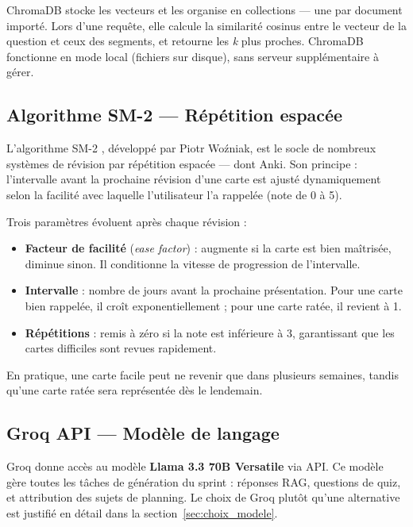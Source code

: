 ChromaDB \cite{chromadb} stocke les vecteurs et les organise en collections — une par document importé. Lors d'une requête, elle calcule la similarité cosinus entre le vecteur de la question et ceux des segments, et retourne les \textit{k} plus proches. ChromaDB fonctionne en mode local (fichiers sur disque), sans serveur supplémentaire à gérer.

\subsection{Algorithme SM-2 — Répétition espacée}

L'algorithme SM-2 \cite{sm2}, développé par Piotr Woźniak, est le socle de nombreux systèmes de révision par répétition espacée — dont Anki. Son principe : l'intervalle avant la prochaine révision d'une carte est ajusté dynamiquement selon la facilité avec laquelle l'utilisateur l'a rappelée (note de 0 à 5).

Trois paramètres évoluent après chaque révision :
\begin{itemize}
    \item \textbf{Facteur de facilité} (\textit{ease factor}) : augmente si la carte est bien maîtrisée, diminue sinon. Il conditionne la vitesse de progression de l'intervalle.
    \item \textbf{Intervalle} : nombre de jours avant la prochaine présentation. Pour une carte bien rappelée, il croît exponentiellement ; pour une carte ratée, il revient à 1.
    \item \textbf{Répétitions} : remis à zéro si la note est inférieure à 3, garantissant que les cartes difficiles sont revues rapidement.
\end{itemize}

En pratique, une carte facile peut ne revenir que dans plusieurs semaines, tandis qu'une carte ratée sera représentée dès le lendemain.

\subsection{Groq API — Modèle de langage}

Groq \cite{groq} donne accès au modèle \textbf{Llama 3.3 70B Versatile} \cite{llama3} via API. Ce modèle gère toutes les tâches de génération du sprint : réponses RAG, questions de quiz, et attribution des sujets de planning. Le choix de Groq plutôt qu'une alternative est justifié en détail dans la section~\ref{sec:choix_modele}.

